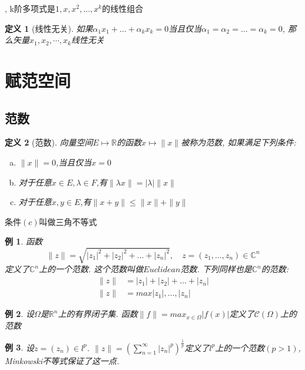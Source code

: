 \documentclass{book}
\newtheorem{definition}{\hspace{2em}定义}[section]
\newtheorem{example}{例}[section]
\begin{document}
, k阶多项式是$1,x,x^2,\dots,x^k$的线性组合

\begin{definition}[线性无关]
  如果$\alpha_1x_1+\dots+\alpha_kx_k=0$当且仅当$\alpha_1=\alpha_2=\dots=\alpha_k=0$, 那么矢量${x_1,x_2,\cdots,x_k}$线性无关
\end{definition}
\section{赋范空间}
\subsection*{范数}
\begin{definition}[范数]
  向量空间$E\mapsto\mathbb{R}$的函数$x\mapsto\|x\|$被称为范数, 如果满足下列条件:
  \begin{enumerate}[(a)]
    \item $\|x\|=0$,当且仅当$x=0$
    \item 对于任意$x\in E,\lambda\in F$,有$\|\lambda x\|=|\lambda|\|x\|$
    \item 对于任意$x,y\in E$,有$\|x+y\|\leq\|x\|+\|y\|$
  \end{enumerate}
\end{definition}
条件$(c)$叫做三角不等式
\begin{example}
  函数
  \begin{equation*}
    \|z\|=\sqrt{|z_1|^2+|z_2|^2+\dots+|z_n|^2},\quad z=(z_1,\dots,z_n)\in\mathbb{C}^n
  \end{equation*}
  定义了$\mathbb{C}^n$上的一个范数. 这个范数叫做$Euclidean$范数. 下列同样也是$\mathbb{C}^n$的范数:
  \begin{equation*}
    \begin{split}
       \|z\| & =|z_1|+|z_2|+\dots+|z_n| \\
       \|z\| & =max{|z_1|,\dots,|z_n|}
    \end{split}
  \end{equation*}
\end{example}
\begin{example}\label{norm1}
  设$\Omega$是$\mathbb{R}^n$上的有界闭子集. 函数$\|f\|=max_{x\in\Omega}|f(x)|$定义了$\mathcal{C}(\Omega)$上的范数
\end{example}
\begin{example}\label{norm2}
  设$z=(z_n)\in l^p$. $\|z\|=(\sum_{n=1}^{\infty}|z_n|^p)^\frac{1}{p}$定义了$l^p$上的一个范数$(p>1)$, Minkowski不等式保证了这一点.
\end{example}
\end{document}
